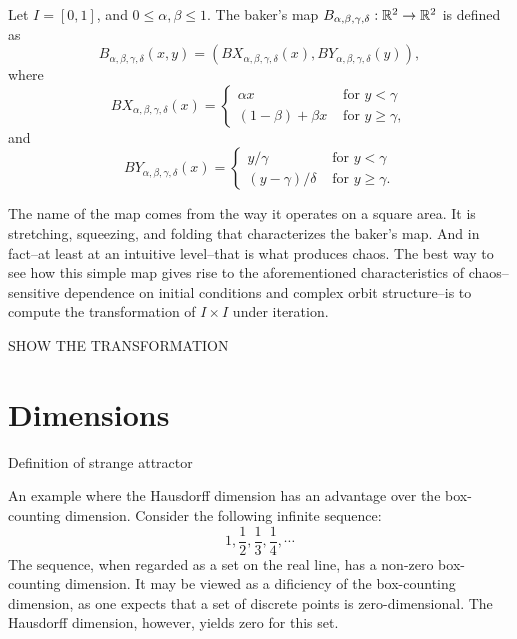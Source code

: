 \documentclass[12pt,twoside]{book}
\begin{document}
\begin{definition}
  Let $I = [0,1]$, and $0 \leq \alpha, \beta \leq 1$.
  The baker's map $B_{\alpha, \beta, \gamma, \delta}: \mathbb{R}^2 \to \mathbb{R}^2$ is defined as
  \begin{equation*}
    B_{\alpha, \beta, \gamma, \delta}(x,y) = (BX_{\alpha, \beta, \gamma, \delta}(x), BY_{\alpha, \beta, \gamma, \delta}(y)),
  \end{equation*}
  where
  \begin{equation*}
    BX_{\alpha, \beta, \gamma, \delta}(x) =
     \begin{cases}
      \alpha x  &\mbox{ for } y < \gamma \\
      (1 - \beta) + \beta x  &\mbox{ for } y \geq \gamma,
    \end{cases}
  \end{equation*}
  and
  \begin{equation*}
    BY_{\alpha, \beta, \gamma, \delta}(x) =
     \begin{cases}
       y/\gamma  &\mbox{ for } y < \gamma \\
       (y - \gamma)/ \delta  &\mbox{ for } y \geq \gamma.
    \end{cases}
  \end{equation*}

  \label{defn:baker}
\end{definition}

The name of the map comes from the way it operates on a square area.
It is stretching, squeezing, and folding that characterizes the baker's map.
And in fact--at least at an intuitive level--that is what produces chaos.
The best way to see how this simple map gives rise to the aforementioned characteristics of chaos--sensitive dependence on initial conditions and complex orbit structure--is to compute the transformation of $I \times I$ under iteration.

SHOW THE TRANSFORMATION

\section{Dimensions}
Definition of strange attractor\citep[p.131]{ruelle}

An example where the Hausdorff dimension has an advantage over the box-counting dimension.
Consider the following infinite sequence:
\begin{equation*}
  1, \frac{1}{2}, \frac{1}{3}, \frac{1}{4}, \cdots
\end{equation*}
The sequence, when regarded as a set on the real line, has a non-zero box-counting dimension.
It may be viewed as a dificiency of the box-counting dimension, as one expects that
a set of discrete points is zero-dimensional.
The Hausdorff dimension, however, yields zero for this set.
\end{document}
